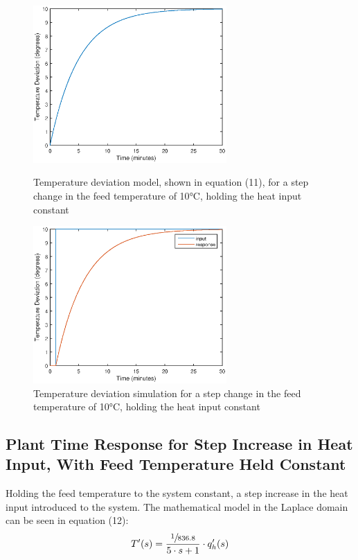 \documentclass{article}
\begin{document}
\begin{figure}[h]
\begin{minipage}{0.45\textwidth}
\centering
\includegraphics[height=6cm]{1a_mod}
\caption{Temperature deviation model, shown in equation (11), for a step change in the feed temperature of 10$\si{\degreeCelsius}$, holding the heat input constant}
\end{minipage}
\hspace{1cm}
\begin{minipage}{0.45\textwidth}
\centering
\includegraphics[height=6cm]{1a_sim}
\caption{Temperature deviation simulation for a step change in the feed temperature of 10$\si{\degreeCelsius}$, holding the heat input constant}
\end{minipage}
\end{figure}

\subsection{Plant Time Response for Step Increase in Heat Input, With Feed Temperature Held Constant}
Holding the feed temperature to the system constant, a step increase in the heat input introduced to the system. The mathematical model in the Laplace domain can be seen in equation (12):
\begin{align}
T'(s) = \frac{\sfrac{1}{836.8}}{5 \cdot s + 1} \cdot q'_h(s)
\end{align} 
\end{document}
